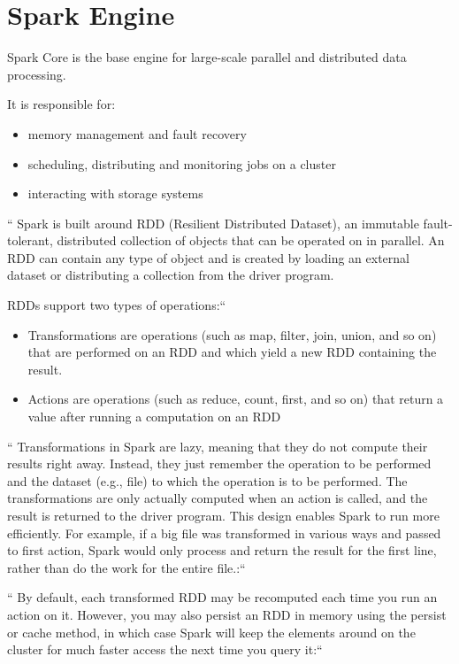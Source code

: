 \section{Spark Engine}

Spark Core is the base engine for large-scale parallel and distributed data processing.


It is responsible for:

\begin{itemize}
   \item  memory management and fault recovery
   \item  scheduling, distributing and monitoring jobs on a cluster
   \item  interacting with storage systems
\end{itemize}

`` Spark is built around  RDD (Resilient Distributed Dataset), an immutable fault-tolerant,
distributed collection of objects that can be operated on in parallel. An RDD can contain
any type of object and is created by loading an external dataset or distributing a collection
from the driver program.


RDDs support two types of operations:``~\cite{hid-sp18-522-topal}


\begin{itemize}
   \item  Transformations are operations (such as map, filter, join, union, and so on) that
          are performed on an RDD and which yield a new RDD containing the result.
   \item  Actions are operations (such as reduce, count, first, and so on) that return
          a value after running a computation on an RDD
\end{itemize}

`` Transformations in Spark are lazy, meaning that they do not compute their results right away.
Instead, they just remember the operation to be performed and the dataset (e.g., file) to
which the operation is to be performed. The transformations are only actually computed when
an action is called, and the result is returned to the driver program. This design enables
Spark to run more efficiently. For example, if a big file was transformed in various ways and
passed to first action, Spark would only process and return the result for the first line,
rather than do the work for the entire file.:``~\cite{hid-sp18-522-topal}


`` By default, each transformed RDD may be recomputed each time you run an action on it.
However, you may also persist an RDD in memory using the persist or cache method, in which
case Spark will keep the elements around on the cluster for much faster access the next
time you query it:``~\cite{hid-sp18-522-topal}



